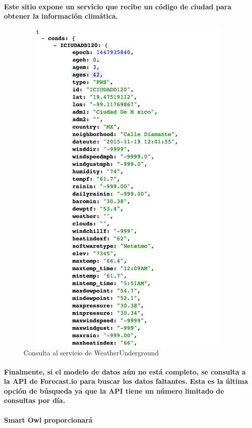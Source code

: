     \paragraph{Este sitio expone un servicio que recibe un código de ciudad para obtener la información climática.}
    \begin{figure}[b!]
      \begin{center}
        \includegraphics[width=12cm,height=17cm]{./images/WeatherUnderground}
        \caption{Consulta al servicio de WeatherUnderground}
      \end{center}
    \end{figure}
    \paragraph{Finalmente, si el modelo de datos aún no está completo, se consulta a la API de Forecast.io para buscar los datos faltantes. Esta es la última opción de búsqueda ya que la API tiene un número limitado de consultas por día.}
    \paragraph{Smart Owl proporcionará}
  
